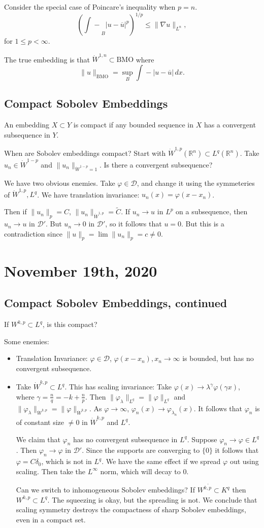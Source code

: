 \documentclass[12pt]{scrartcl}
\newcommand{\R}{\mathbb{R}}
\let \phi \varphi
\let \mc \mathcal
\let \ol \overline
\newcommand{\aint}{\mathrel{\int\!\!\!\!\!\!-}}
\let \grad \nabla
\begin{document}
Consider the special case of Poincare's inequality when $p = n$.
$$\left ( \aint_B |u - \ol u|^p \right )^{1/p} \le \|\grad u \|_{L^n},$$
for $1 \le p < \infty$.

The true embedding is that $\dot{W}^{1, n} \subset \text{BMO}$ where 
$$\|u\|_{\text{BMO}} = \sup_{B} \aint |u - \ol u|\, dx.$$
\subsection{Compact Sobolev Embeddings}
An embedding $X \subset Y$ is compact if any bounded sequence in $X$ has a convergent subsequence in $Y$.

When are Sobolev embeddings compact?  Start with $\dot W^{1,p}(\R^n) \subset L^q(\R^n)$.  Take $u_n \in \dot W^{1-p}$ and $\|u_n\|_{\dot W^{1-p} = 1}$.  Is there a convergent subsequence?  

We have two obvious enemies.  Take $\phi \in \mathcal D$, and change it using the symmeteries of $\dot{W}^{1,p}, L^q$.  We have translation invariance: $u_n(x) = \phi(x-  x_n)$.

Then if $\|u_n\|_p = C$, $\|u_n\|_{\dot W^{1,p}} = \tilde{C}$.  If $u_n \to u$ in $L^p$ on a subsequence, then $u_n \to u$ in $\mathcal D'$.  But $u_n \to 0$ in $\mc D'$, so it follows that $u = 0$.  But this is a contradiction since $\|u\|_{p} = \lim \|u_n\|_p = c \ne 0$.
\pagebreak
\section{November 19th, 2020}
\subsection{Compact Sobolev Embeddings, continued}
If $W^{k, p} \subset L^q$, is this compact?

Some enemies:
\begin{itemize}
\item Translation Invariance:  $\phi \in \mc D$, $\phi(x - x_n), x_n \to \infty$ is bounded, but has no convergent subsequence.
\item Take $\dot{W}^{k, p} \subset L^q$.  This has scaling invariance: Take $\phi(x) \to \lambda^\gamma \phi(\gamma x)$, where $\gamma = \frac{n}{q} = -k + \frac{n}{p}.$  Then $\|\phi_\lambda\|_{L^q} = \|\phi\|_{L^q}$ and $\|\phi_\lambda\|_{\dot{W}^{k, p}} = \|\phi\|_{\dot{W}^{k, p}}$.  As $\phi \to \infty$, $\phi_n(x) \to \phi_{\lambda_n}(x)$.  It follows that $\phi_n$ is of constant size $\ne 0$ in $\dot{W}^{k, p}$ and $L^q$.  

We claim that $\phi_n$ has no convergent subsequence in $L^q$.  Suppose $\phi_n \to \phi \in L^q$.  Then $\phi_n \to \phi$ in $\mc D'$.  Since the supports are converging to $\{0\}$ it follows that $\phi = C\delta_0$, which is not in $L^q$.  We have the same effect if we spread $\phi$ out using scaling.  Then take the $L^\infty$ norm, which will decay to $0$.

Can we switch to inhomogeneous Sobolev embeddings?  If $\dot{W^{k, p} \subset} K^q$ then $W^{k, p} \subset L^q$.  The squeezing is okay, but the spreading is not.  We conclude that scaling symmetry destroys the compactness of sharp Sobolev embeddings, even in a compact set.
\end{itemize}
\end{document}
